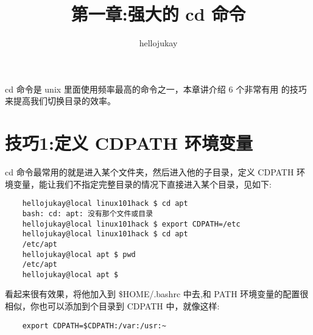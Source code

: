 \documentclass[UTF8]{ctexart}
\title{第一章:强大的 cd 命令}
\author{hellojukay}
\begin{document}
\maketitle
cd 命令是 unix 里面使用频率最高的命令之一，本章讲介绍 6 个非常有用
的技巧来提高我们切换目录的效率。

\section*{技巧1:定义 CDPATH 环境变量}
cd 命令最常用的就是进入某个文件夹，然后进入他的子目录，定义 CDPATH 环
境变量，能让我们不指定完整目录的情况下直接进入某个目录，见如下:
\begin{lstlisting}
    hellojukay@local linux101hack $ cd apt
    bash: cd: apt: 没有那个文件或目录
    hellojukay@local linux101hack $ export CDPATH=/etc
    hellojukay@local linux101hack $ cd apt
    /etc/apt
    hellojukay@local apt $ pwd
    /etc/apt
    hellojukay@local apt $ 
\end{lstlisting}
看起来很有效果，将他加入到 \$HOME/.bashrc 中去,和 PATH 环境变量的配置很
相似，你也可以添加到个目录到 CDPATH 中，就像这样:
\begin{lstlisting}
    export CDPATH=$CDPATH:/var:/usr:~
\end{lstlisting}
\end{document}
